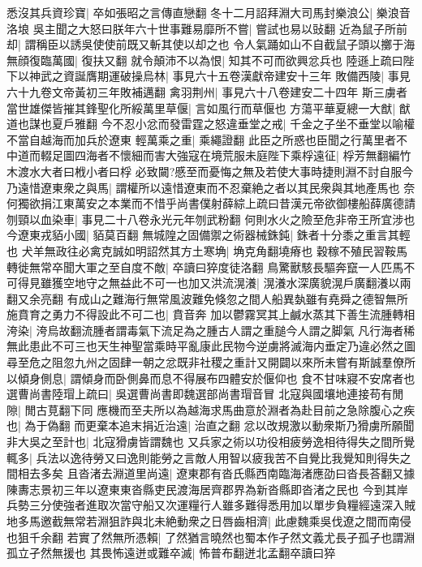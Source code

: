 悉沒其兵資珍寶|{
	卒如張昭之言傳直戀翻}
冬十二月詔拜淵大司馬封樂浪公|{
	樂浪音洛埌}
吳主聞之大怒曰朕年六十世事難易靡所不嘗|{
	嘗試也易以䜴翻}
近為鼠子所前却|{
	謂稱臣以誘吳使使前既又斬其使以却之也}
令人氣踊如山不自截鼠子頭以擲于海無顔復臨萬國|{
	復扶又翻}
就令顛沛不以為恨|{
	知其不可而欲興忿兵也}
陸遜上疏曰陛下以神武之資誕膺期運破操烏林|{
	事見六十五卷漢獻帝建安十三年}
敗備西陵|{
	事見六十九卷文帝黃初三年敗補邁翻}
禽羽荆州|{
	事見六十八卷建安二十四年}
斯三虜者當世雄傑皆摧其鋒聖化所綏萬里草偃|{
	言如風行而草偃也}
方蕩平華夏總一大猷|{
	猷道也謀也夏戶雅翻}
今不忍小忿而發雷霆之怒違垂堂之戒|{
	千金之子坐不垂堂以喻權不當自越海而加兵於遼東}
輕萬乘之重|{
	乘繩證翻}
此臣之所惑也臣聞之行萬里者不中道而輟足圖四海者不懷細而害大強寇在境荒服未庭陛下乘桴遠征|{
	桴芳無翻編竹木渡水大者曰栰小者曰桴}
必致闚?慼至而憂悔之無及若使大事時捷則淵不討自服今乃遠惜遼東衆之與馬|{
	謂權所以遠惜遼東而不忍棄絶之者以其民衆與其地產馬也}
奈何獨欲捐江東萬安之本業而不惜乎尚書僕射薛綜上疏曰昔漢元帝欲御樓船薛廣德請刎頸以血染車|{
	事見二十八卷永光元年刎武粉翻}
何則水火之險至危非帝王所宜涉也今遼東戎貊小國|{
	貊莫百翻}
無城隍之固備禦之術器械銖鈍|{
	銖者十分黍之重言其輕也}
犬羊無政往必禽克誠如明詔然其方土寒埆|{
	埆克角翻墝瘠也}
穀稼不殖民習鞍馬轉徙無常卒聞大軍之至自度不敵|{
	卒讀曰猝度徒洛翻}
鳥驚獸駭長驅奔竄一人匹馬不可得見雖獲空地守之無益此不可一也加又洪流滉瀁|{
	滉瀁水深廣貌滉戶廣翻瀁以兩翻又余亮翻}
有成山之難海行無常風波難免倏忽之間人船異埶雖有堯舜之德智無所施賁育之勇力不得設此不可二也|{
	賁音奔}
加以鬱霧冥其上鹹水蒸其下善生流腫轉相洿染|{
	洿烏故翻流腫者謂毒氣下流足為之腫古人謂之重膇今人謂之脚氣}
凡行海者稀無此患此不可三也天生神聖當乘時平亂康此民物今逆虜將滅海内垂定乃違必然之圖尋至危之阻忽九州之固肆一朝之忿既非社稷之重計又開闢以來所未嘗有斯誠羣僚所以傾身側息|{
	謂傾身而卧側鼻而息不得展布四體安於偃仰也}
食不甘味寢不安席者也選曹尚書陸瑁上疏曰|{
	吳選曹尚書即魏選部尚書瑁音冒}
北寇與國壤地連接苟有閒隙|{
	閒古莧翻下同}
應機而至夫所以為越海求馬曲意於淵者為赴目前之急除腹心之疾也|{
	為于偽翻}
而更棄本追末捐近治遠|{
	治直之翻}
忿以改規激以動衆斯乃猾虜所願聞非大吳之至計也|{
	北寇猾虜皆謂魏也}
又兵家之術以功役相疲勞逸相待得失之間所覺輒多|{
	兵法以逸待勞又曰逸則能勞之言敵人用智以疲我苦不自覺比我覺知則得失之間相去多矣}
且沓渚去淵道里尚遠|{
	遼東郡有沓氏縣西南臨海渚應劭曰沓長荅翻又據陳夀志景初三年以遼東東沓縣吏民渡海居齊郡界為新沓縣即沓渚之民也}
今到其岸兵勢三分使強者進取次當守船又次運糧行人雖多難得悉用加以單步負糧經遠深入賊地多馬邀截無常若淵狙詐與北未絶動衆之日唇齒相濟|{
	此慮魏乘吳伐遼之間而南侵也狙千余翻}
若實了然無所憑賴|{
	了然猶言曉然也蜀本作孑然文義尤長孑孤孑也謂淵孤立孑然無援也}
其畏怖遠迸或難卒滅|{
	怖普布翻迸北孟翻卒讀曰猝}
